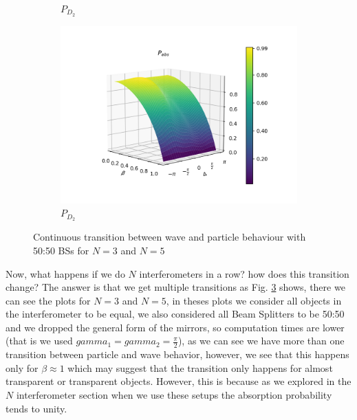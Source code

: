 \documentclass{book}
\begin{document}
\begin{figure}[H]
\begin{subfigure}[b]{0.30\linewidth}
\caption{$P_{D_{2}}$ }
\label{fig:BS1}
\end{subfigure}
\begin{subfigure}[b]{0.30\linewidth}
\includegraphics[width=\linewidth]{images/pabs_5_pi4.png}
\caption{$P_{D_{2}}$ }
\label{fig:BS1}
\end{subfigure}
\caption{Continuous transition between wave and particle behaviour with 50:50 BSs for $N=3$ and $N=5$}
\label{varias}
\end{figure}

Now, what happens if we do $N$ interferometers in a row? how does this transition change? The answer is that we get multiple transitions as Fig. \ref{varias} shows, there we can see the plots for $N=3$ and $N=5$, in theses plots we consider all objects in the interferometer to be equal, we also considered all Beam Splitters to be 50:50 and we dropped the general form of the mirrors, so computation times are lower (that is we used $gamma_{1}=gamma_{2}=\frac{\pi}{2}$), as we can see we have more than one transition between particle and wave behavior, however, we see that this happens only for $\beta \approx 1$ which may suggest that the transition only happens for almost transparent or transparent objects. However, this is because as we explored in the $N$ interferometer section when we use these setups the absorption probability tends to unity.
\end{document}
